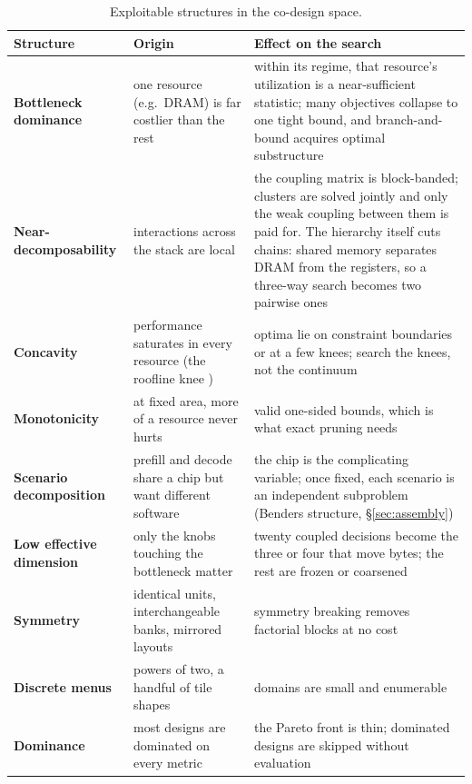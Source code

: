 \documentclass[11pt]{article}
\begin{document}
\begin{table}[H]
\small
\begin{tabular}{@{}L{0.19\textwidth}L{0.29\textwidth}L{0.42\textwidth}@{}}
\toprule
Structure & Origin & Effect on the search \\
\midrule
\textbf{Bottleneck dominance} & one resource (e.g.~DRAM) is far costlier than the rest & within its regime, that resource's utilization is a near-sufficient statistic; many objectives collapse to one tight bound, and branch-and-bound acquires optimal substructure \\
\textbf{Near-decomposability} \cite{r101} & interactions across the stack are local & the coupling matrix is block-banded; clusters are solved jointly and only the weak coupling between them is paid for. The hierarchy itself cuts chains: shared memory separates DRAM from the registers, so a three-way search becomes two pairwise ones \\
\textbf{Concavity} & performance saturates in every resource (the roofline knee \cite{r102}) & optima lie on constraint boundaries or at a few knees; search the knees, not the continuum \\
\textbf{Monotonicity} & at fixed area, more of a resource never hurts & valid one-sided bounds, which is what exact pruning needs \\
\textbf{Scenario decomposition} & prefill and decode share a chip but want different software & the chip is the complicating variable; once fixed, each scenario is an independent subproblem (Benders structure, §\ref{sec:assembly}) \\
\textbf{Low effective dimension} & only the knobs touching the bottleneck matter & twenty coupled decisions become the three or four that move bytes; the rest are frozen or coarsened \\
\textbf{Symmetry} & identical units, interchangeable banks, mirrored layouts & symmetry breaking removes factorial blocks at no cost \\
\textbf{Discrete menus} & powers of two, a handful of tile shapes & domains are small and enumerable \\
\textbf{Dominance} & most designs are dominated on every metric & the Pareto front is thin; dominated designs are skipped without evaluation \\
\bottomrule
\end{tabular}
\caption{Exploitable structures in the co-design space.}
\label{tab:catalog}
\end{table}
\end{document}

